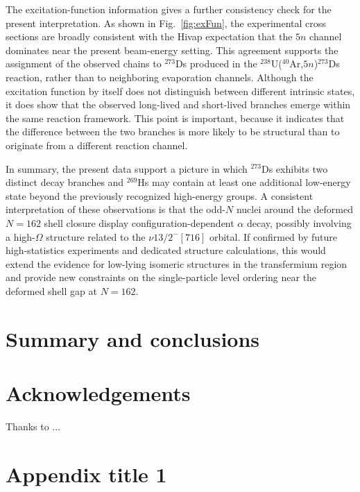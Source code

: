 \documentclass[final,5p,times,twocolumn,number,sort&compress]{elsarticle}
\begin{document}
The excitation-function information gives a further consistency check for the present interpretation.
 As shown in Fig.~\ref{fig:exFun}, the experimental cross sections are broadly consistent with the Hivap expectation that the $5n$ channel dominates near the present beam-energy setting. 
 This agreement supports the assignment of the observed chains to $^{273}$Ds produced in the $^{238}$U($^{40}$Ar,$5n$)$^{273}$Ds reaction, rather than to neighboring evaporation channels. 
 Although the excitation function by itself does not distinguish between different intrinsic states, it does show that the observed long-lived and short-lived branches emerge within the same reaction framework.
  This point is important, because it indicates that the difference between the two branches is more likely to be structural than to originate from a different reaction channel.

In summary, the present data support a picture in which $^{273}$Ds exhibits two distinct decay branches and $^{269}$Hs may contain at least one additional low-energy state beyond the previously recognized high-energy groups.
 A consistent interpretation of these observations is that the odd-$N$ nuclei around the deformed $N=162$ shell closure display configuration-dependent $\alpha$ decay, possibly involving a high-$\Omega$ structure related to the $\nu 13/2^{-}[716]$ orbital. 
 If confirmed by future high-statistics experiments and dedicated structure calculations, this would extend the evidence for low-lying isomeric structures in the transfermium region and provide new constraints on the single-particle level ordering near the deformed shell gap at $N=162$.

\section{Summary and conclusions}
\lipsum[1-4]


\section*{Acknowledgements}
Thanks to ...

\appendix

\section{Appendix title 1}
\end{document}
